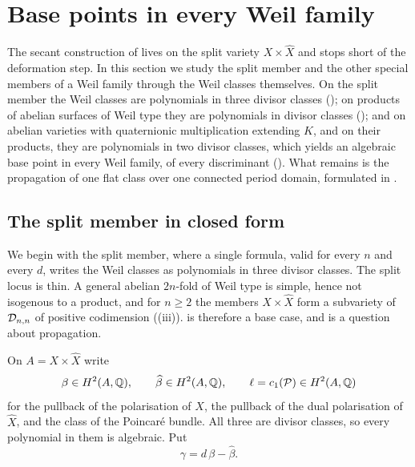 \section{Base points in every Weil family}\label{sec:basepoints}

The secant construction of  lives on the split variety
$X\times\widehat{X}$ and stops short of the deformation step. In this section
we study the split member and the other special members of a Weil family
through the Weil classes themselves. On the split member the Weil classes are
polynomials in three divisor classes (); on products of
abelian surfaces of Weil type they are polynomials in divisor classes
(); and on abelian varieties with quaternionic
multiplication extending $K$, and on their products, they are polynomials in
two divisor classes, which yields an algebraic base point in every Weil
family, of every discriminant (). What remains is the
propagation of one flat class over one connected period domain, formulated
in .

\subsection{The split member in closed form}\label{ssec:split}

We begin with the split member, where a single formula, valid for every $n$
and every $d$, writes the Weil classes as polynomials in three divisor
classes. The split locus is thin. A general abelian $2n$-fold
of Weil type is simple, hence not isogenous to a product, and for $n\ge2$ the
members $X\times\widehat{X}$ form a subvariety of $\mathcal{D}_{n,n}$ of positive
codimension ((iii)).  is
therefore a base case, and  is a question about propagation.

\begin{notation}\label{not:threeclasses}
On $A=X\times\widehat{X}$ write
\[
  \beta\in H^{2}(A,\mathbb{Q}),
  \qquad
  \widehat{\beta}\in H^{2}(A,\mathbb{Q}),
  \qquad
  \ell=c_{1}(\mathcal{P})\in H^{2}(A,\mathbb{Q})
\]
for the pullback of the polarisation of $X$, the pullback of the dual
polarisation of $\widehat{X}$, and the class of the Poincar\'e bundle. All
three are divisor classes, so every polynomial in them is algebraic. Put
\begin{equation}\label{eq:gammadef}
  \gamma=d\,\beta-\widehat{\beta}.
\end{equation}
\end{notation}

